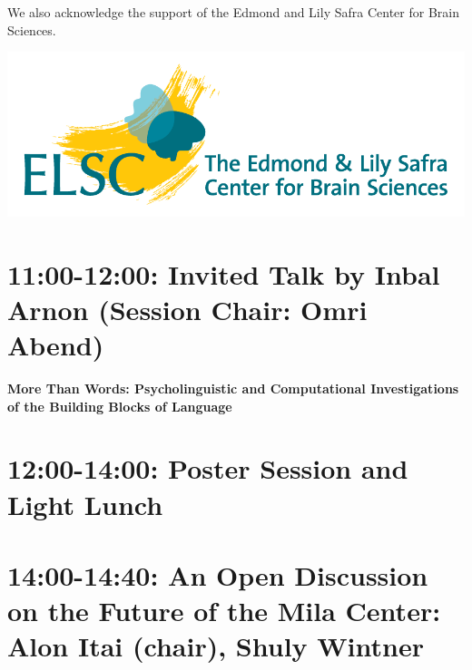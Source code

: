 \documentclass[a0,portrait]{a0poster}
\newcommand{\forceindent}{\leavevmode{\parindent=1em\indent}}
\begin{document}
\begin{minipage}{.2\textwidth}
        \vspace{1cm}

        \begin{flushleft}
            We also acknowledge the support of the Edmond and Lily Safra Center for Brain Sciences.
        \end{flushleft}
        \includegraphics[width=\textwidth]{elsc_logo.png}
    \end{minipage}

    \begin{minipage}{.95\textwidth}
        \LARGE

        \section*{11:00-12:00: Invited Talk by Inbal Arnon (Session Chair: Omri Abend)}
        \forceindent\LARGE\textbf{More Than Words: Psycholinguistic and Computational Investigations of the Building
        Blocks of Language}\\

        \section*{12:00-14:00: Poster Session and Light Lunch}

        \section*{14:00-14:40: An Open Discussion on the Future of the Mila Center:
        Alon Itai (chair), Shuly Wintner}
    \end{minipage}
\end{document}
